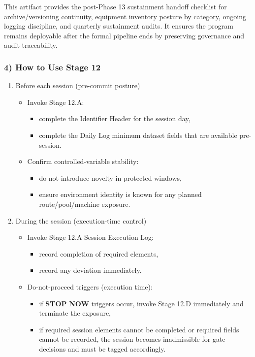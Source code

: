 \documentclass[10pt]{article}
\begin{document}
This artifact provides the post-Phase 13 sustainment handoff checklist for archive/versioning continuity, equipment inventory posture by category, ongoing logging discipline, and quarterly sustainment audits. It ensures the program remains deployable after the formal pipeline ends by preserving governance and audit traceability.

\subsubsection*{4) How to Use Stage 12}

\begin{enumerate}
\item Before each session (pre-commit posture)
  \begin{itemize}
  \item Invoke Stage 12.A:
    \begin{itemize}
    \item complete the Identifier Header for the session day,
    \item complete the Daily Log minimum dataset fields that are available pre-session.
    \end{itemize}
  \item Confirm controlled-variable stability:
    \begin{itemize}
    \item do not introduce novelty in protected windows,
    \item ensure environment identity is known for any planned route/pool/machine exposure.
    \end{itemize}
  \end{itemize}

\item During the session (execution-time control)
  \begin{itemize}
  \item Invoke Stage 12.A Session Execution Log:
    \begin{itemize}
    \item record completion of required elements,
    \item record any deviation immediately.
    \end{itemize}
  \item Do-not-proceed triggers (execution time):
    \begin{itemize}
    \item if \textbf{STOP} \textbf{NOW} triggers occur, invoke Stage 12.D immediately and terminate the exposure,
    \item if required session elements cannot be completed or required fields cannot be recorded, the session becomes inadmissible for gate decisions and must be tagged accordingly.
    \end{itemize}
  \end{itemize}


\end{enumerate}
\end{document}
